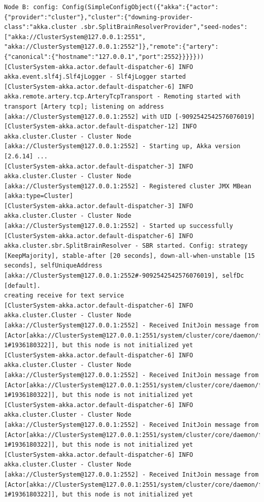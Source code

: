 \documentclass[12pt]{article}
\begin{document}
\begin{verbatim}
Node B: config: Config(SimpleConfigObject({"akka":{"actor":{"provider":"cluster"},"cluster":{"downing-provider-class":"akka.cluster .sbr.SplitBrainResolverProvider","seed-nodes":["akka://ClusterSystem@127.0.0.1:2551", "akka://ClusterSystem@127.0.0.1:2552"]},"remote":{"artery":{"canonical":{"hostname":"127.0.0.1","port":2552}}}}}))
[ClusterSystem-akka.actor.default-dispatcher-6] INFO akka.event.slf4j.Slf4jLogger - Slf4jLogger started
[ClusterSystem-akka.actor.default-dispatcher-6] INFO akka.remote.artery.tcp.ArteryTcpTransport - Remoting started with transport [Artery tcp]; listening on address [akka://ClusterSystem@127.0.0.1:2552] with UID [-9092542542576076019]
[ClusterSystem-akka.actor.default-dispatcher-12] INFO akka.cluster.Cluster - Cluster Node [akka://ClusterSystem@127.0.0.1:2552] - Starting up, Akka version [2.6.14] ...
[ClusterSystem-akka.actor.default-dispatcher-3] INFO akka.cluster.Cluster - Cluster Node [akka://ClusterSystem@127.0.0.1:2552] - Registered cluster JMX MBean [akka:type=Cluster]
[ClusterSystem-akka.actor.default-dispatcher-3] INFO akka.cluster.Cluster - Cluster Node [akka://ClusterSystem@127.0.0.1:2552] - Started up successfully
[ClusterSystem-akka.actor.default-dispatcher-6] INFO akka.cluster.sbr.SplitBrainResolver - SBR started. Config: strategy [KeepMajority], stable-after [20 seconds], down-all-when-unstable [15 seconds], selfUniqueAddress [akka://ClusterSystem@127.0.0.1:2552#-9092542542576076019], selfDc [default].
creating receive for text service
[ClusterSystem-akka.actor.default-dispatcher-6] INFO akka.cluster.Cluster - Cluster Node [akka://ClusterSystem@127.0.0.1:2552] - Received InitJoin message from [Actor[akka://ClusterSystem@127.0.0.1:2551/system/cluster/core/daemon/firstSeedNodeProcess-1#1936180322]], but this node is not initialized yet
[ClusterSystem-akka.actor.default-dispatcher-6] INFO akka.cluster.Cluster - Cluster Node [akka://ClusterSystem@127.0.0.1:2552] - Received InitJoin message from [Actor[akka://ClusterSystem@127.0.0.1:2551/system/cluster/core/daemon/firstSeedNodeProcess-1#1936180322]], but this node is not initialized yet
[ClusterSystem-akka.actor.default-dispatcher-6] INFO akka.cluster.Cluster - Cluster Node [akka://ClusterSystem@127.0.0.1:2552] - Received InitJoin message from [Actor[akka://ClusterSystem@127.0.0.1:2551/system/cluster/core/daemon/firstSeedNodeProcess-1#1936180322]], but this node is not initialized yet
[ClusterSystem-akka.actor.default-dispatcher-6] INFO akka.cluster.Cluster - Cluster Node [akka://ClusterSystem@127.0.0.1:2552] - Received InitJoin message from [Actor[akka://ClusterSystem@127.0.0.1:2551/system/cluster/core/daemon/firstSeedNodeProcess-1#1936180322]], but this node is not initialized yet

\end{verbatim}
\end{document}
